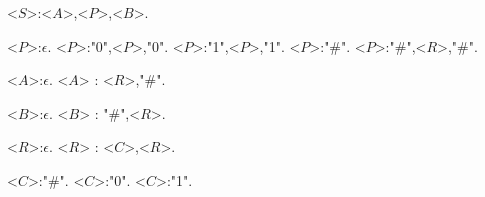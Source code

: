<$S$>:<$A$>,<$P$>,<$B$>.

<$P$>:$\epsilon$.
<$P$>:"0",<$P$>,"0".
<$P$>:"1",<$P$>,"1".
<$P$>:"\#".
<$P$>:"\#",<$R$>,"\#".

<$A$>:$\epsilon$.
<$A$> : <$R$>,"\#".

<$B$>:$\epsilon$.
<$B$> : "\#",<$R$>.

<$R$>:$\epsilon$.
<$R$> : <$C$>,<$R$>.

<$C$>:"\#".
<$C$>:"0".
<$C$>:"1".